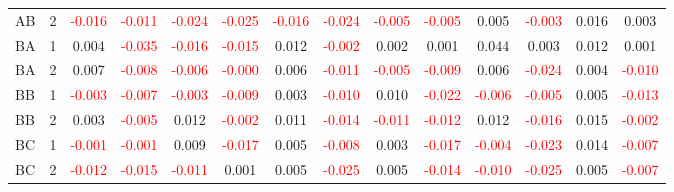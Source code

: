 \begin{table}[!htb]
{\begin{tabular}{llcccccccccccc}
AB & 2 & \textcolor{red}{-0.016} & \textcolor{red}{-0.011} & \textcolor{red}{-0.024} & \textcolor{red}{-0.025} & \textcolor{red}{-0.016} & \textcolor{red}{-0.024} & \textcolor{red}{-0.005} & \textcolor{red}{-0.005} & 0.005 & \textcolor{red}{-0.003} & 0.016 & 0.003\\
BA & 1 & 0.004 & \textcolor{red}{-0.035} & \textcolor{red}{-0.016} & \textcolor{red}{-0.015} & 0.012 & \textcolor{red}{-0.002} & 0.002 & 0.001 & 0.044 & 0.003 & 0.012 & 0.001\\
BA & 2 & 0.007 & \textcolor{red}{-0.008} & \textcolor{red}{-0.006} & \textcolor{red}{-0.000} & 0.006 & \textcolor{red}{-0.011} & \textcolor{red}{-0.005} & \textcolor{red}{-0.009} & 0.006 & \textcolor{red}{-0.024} & 0.004 & \textcolor{red}{-0.010}\\
BB & 1 & \textcolor{red}{-0.003} & \textcolor{red}{-0.007} & \textcolor{red}{-0.003} & \textcolor{red}{-0.009} & 0.003 & \textcolor{red}{-0.010} & 0.010 & \textcolor{red}{-0.022} & \textcolor{red}{-0.006} & \textcolor{red}{-0.005} & 0.005 & \textcolor{red}{-0.013}\\
BB & 2 & 0.003 & \textcolor{red}{-0.005} & 0.012 & \textcolor{red}{-0.002} & 0.011 & \textcolor{red}{-0.014} & \textcolor{red}{-0.011} & \textcolor{red}{-0.012} & 0.012 & \textcolor{red}{-0.016} & 0.015 & \textcolor{red}{-0.002}\\
BC & 1 & \textcolor{red}{-0.001} & \textcolor{red}{-0.001} & 0.009 & \textcolor{red}{-0.017} & 0.005 & \textcolor{red}{-0.008} & 0.003 & \textcolor{red}{-0.017} & \textcolor{red}{-0.004} & \textcolor{red}{-0.023} & 0.014 & \textcolor{red}{-0.007}\\
BC & 2 & \textcolor{red}{-0.012} & \textcolor{red}{-0.015} & \textcolor{red}{-0.011} & 0.001 & 0.005 & \textcolor{red}{-0.025} & 0.005 & \textcolor{red}{-0.014} & \textcolor{red}{-0.010} & \textcolor{red}{-0.025} & 0.005 & \textcolor{red}{-0.007}\\
\hline
    \end{tabular}%
    }
\end{table}

